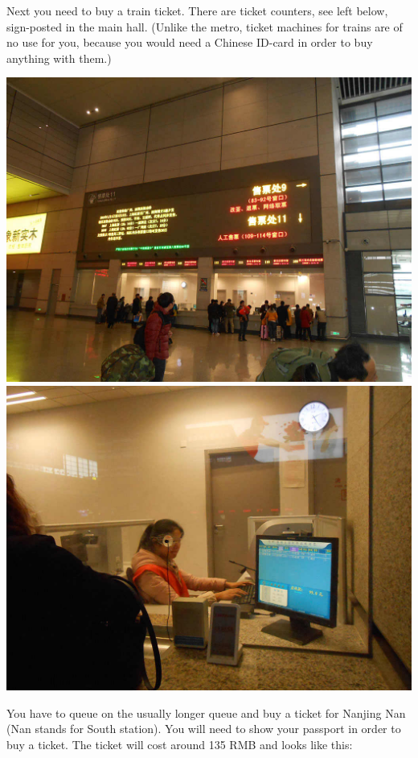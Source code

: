 \documentclass[11pt]{report}
\begin{document}
Next you need to buy a train ticket. There are ticket
counters, see left below, sign-posted in the main hall. (Unlike
the metro, ticket machines for trains are of no use for you,
because you would need a Chinese ID-card in order to buy
anything with them.)

\begin{center}
\includegraphics[scale=0.8]{travel_guide/image038.jpg}
\includegraphics[scale=0.8]{travel_guide/image040.jpg} 
\end{center}

\noindent You have to queue on the usually longer queue and
buy a ticket for Nanjing Nan (Nan stands for South station).
You will need to show your passport in order to buy a ticket.
The ticket will cost around 135 RMB and looks like this:
\end{document}
